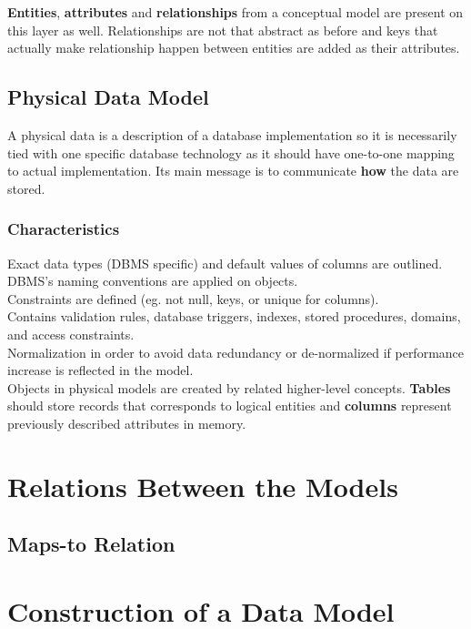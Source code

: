 \textbf{Entities}, \textbf{attributes} and \textbf{relationships} from a conceptual model are present on this layer as well. Relationships are not that abstract as before and keys that actually make relationship happen between entities are added as their attributes.

\subsection{Physical Data Model}

A physical data is a description of a database implementation so it is necessarily tied with one specific database technology as it should have one-to-one mapping to actual implementation. Its main message is to communicate \textbf{how} the data are stored.

\subsubsection{Characteristics}

Exact data types (DBMS specific) and default values of columns are outlined. \\
DBMS's naming conventions are applied on objects. \\
Constraints are defined (eg. not null, keys, or unique for columns). \\
Contains validation rules, database triggers, indexes, stored procedures, domains, and access constraints. \\ 
Normalization in order to avoid data redundancy or de-normalized if performance increase is reflected in the model. \\

Objects in physical models are created by related higher-level concepts. \textbf{Tables} should store records that corresponds to logical entities and \textbf{columns} represent previously described attributes in memory.


\section{Relations Between the Models}

\subsection{Maps-to Relation}

\section{Construction of a Data Model}

